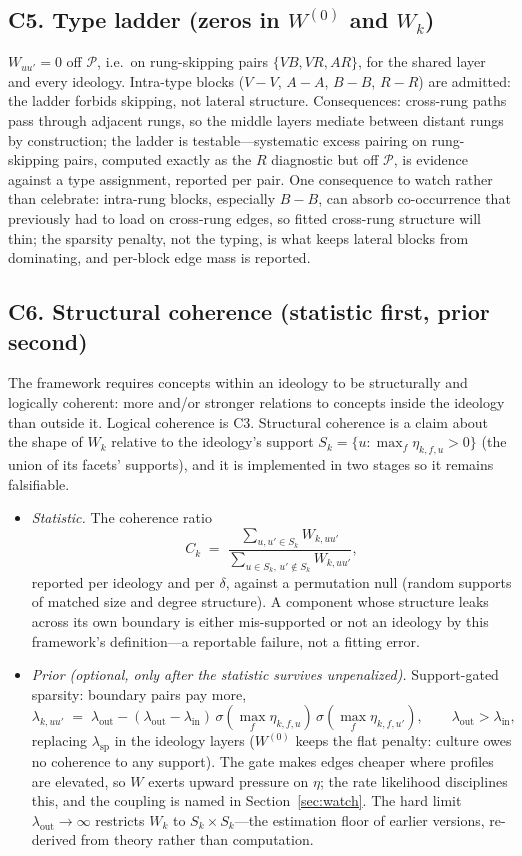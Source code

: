 \documentclass[11pt]{article}
\newcommand{\PP}{\mathcal{P}}
\newcommand{\1}{\mathbb{1}}
\begin{document}
\subsection*{C5. Type ladder (zeros in $W^{(0)}$ and $W_k$)}
$W_{uu'}=0$ off $\PP$, i.e.\ on rung-skipping pairs $\{VB,VR,AR\}$, for the shared layer and every ideology. Intra-type blocks ($V\!-\!V$, $A\!-\!A$, $B\!-\!B$, $R\!-\!R$) are admitted: the ladder forbids skipping, not lateral structure. Consequences: cross-rung paths pass through adjacent rungs, so the middle layers mediate between distant rungs by construction; the ladder is testable---systematic excess pairing on rung-skipping pairs, computed exactly as the $R$ diagnostic but off $\PP$, is evidence against a type assignment, reported per pair. One consequence to watch rather than celebrate: intra-rung blocks, especially $B\!-\!B$, can absorb co-occurrence that previously had to load on cross-rung edges, so fitted cross-rung structure will thin; the sparsity penalty, not the typing, is what keeps lateral blocks from dominating, and per-block edge mass is reported.

\subsection*{C6. Structural coherence (statistic first, prior second)}
The framework requires concepts within an ideology to be structurally and logically coherent: more and/or stronger relations to concepts inside the ideology than outside it. Logical coherence is C3. Structural coherence is a claim about the shape of $W_k$ relative to the ideology's support $S_k=\{u:\max_f\eta_{k,f,u}>0\}$ (the union of its facets' supports), and it is implemented in two stages so it remains falsifiable.
\begin{itemize}
  \item \emph{Statistic.} The coherence ratio
  \[
    C_k \;=\; \frac{\sum_{u,u'\in S_k}W_{k,uu'}}{\sum_{u\in S_k,\,u'\notin S_k}W_{k,uu'}},
  \]
  reported per ideology and per $\delta$, against a permutation null (random supports of matched size and degree structure). A component whose structure leaks across its own boundary is either mis-supported or not an ideology by this framework's definition---a reportable failure, not a fitting error.
  \item \emph{Prior (optional, only after the statistic survives unpenalized).} Support-gated sparsity: boundary pairs pay more,
  \[
    \lambda_{k,uu'} \;=\; \lambda_{\text{out}}-(\lambda_{\text{out}}-\lambda_{\text{in}})\,\sigma(\textstyle\max_f\eta_{k,f,u})\,\sigma(\max_f\eta_{k,f,u'}),\qquad \lambda_{\text{out}}>\lambda_{\text{in}},
  \]
  replacing $\lambda_{\text{sp}}$ in the ideology layers ($W^{(0)}$ keeps the flat penalty: culture owes no coherence to any support). The gate makes edges cheaper where profiles are elevated, so $W$ exerts upward pressure on $\eta$; the rate likelihood disciplines this, and the coupling is named in Section~\ref{sec:watch}. The hard limit $\lambda_{\text{out}}\to\infty$ restricts $W_k$ to $S_k\times S_k$---the estimation floor of earlier versions, re-derived from theory rather than computation.
\end{itemize}
\end{document}
